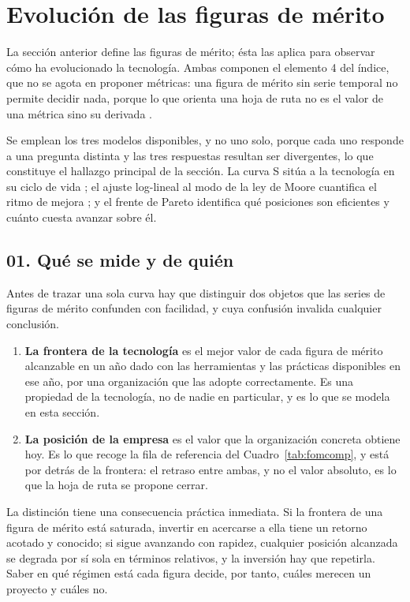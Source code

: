 \documentclass[11pt,letterpaper]{article}
\newcommand{\subsec}[1]{%
  \subsection*{#1}%
  \phantomsection\addcontentsline{toc}{subsection}{#1}}
\begin{document}
\section{Evolución de las figuras de mérito}
\label{sec:evol}

La sección anterior define las figuras de mérito; ésta las aplica para
observar cómo ha evolucionado la tecnología. Ambas componen el elemento 4 del
índice, que no se agota en proponer métricas: una figura de mérito sin serie
temporal no permite decidir nada, porque lo que orienta una hoja de ruta no es
el valor de una métrica sino su derivada \parencite{deweck2022}.

Se emplean los tres modelos disponibles, y no uno solo, porque cada uno
responde a una pregunta distinta y las tres respuestas resultan ser
divergentes, lo que constituye el hallazgo principal de la sección. La curva S
sitúa a la tecnología en su ciclo de vida \parencite{foster1986}; el ajuste
log-lineal al modo de la ley de Moore cuantifica el ritmo de mejora
\parencite{moore1965}; y el frente de Pareto identifica qué posiciones son
eficientes y cuánto cuesta avanzar sobre él.

\subsec{01. Qué se mide y de quién}

Antes de trazar una sola curva hay que distinguir dos objetos que las series
de figuras de mérito confunden con facilidad, y cuya confusión invalida
cualquier conclusión.

\begin{enumerate}
  \item \textbf{La frontera de la tecnología} es el mejor valor de cada figura
    de mérito alcanzable en un año dado con las herramientas y las prácticas
    disponibles en ese año, por una organización que las adopte
    correctamente. Es una propiedad de la tecnología, no de nadie en
    particular, y es lo que se modela en esta sección.
  \item \textbf{La posición de la empresa} es el valor que la organización
    concreta obtiene hoy. Es lo que recoge la fila de referencia del
    Cuadro~\ref{tab:fomcomp}, y está por detrás de la frontera: el retraso
    entre ambas, y no el valor absoluto, es lo que la hoja de ruta se propone
    cerrar.
\end{enumerate}

La distinción tiene una consecuencia práctica inmediata. Si la frontera de una
figura de mérito está saturada, invertir en acercarse a ella tiene un retorno
acotado y conocido; si sigue avanzando con rapidez, cualquier posición
alcanzada se degrada por sí sola en términos relativos, y la inversión hay que
repetirla. Saber en qué régimen está cada figura decide, por tanto, cuáles
merecen un proyecto y cuáles no.
\end{document}
